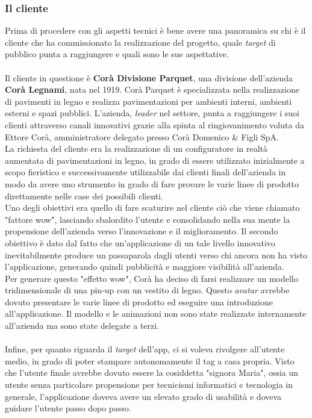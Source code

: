 \subsubsection{Il cliente}
Prima di procedere con gli aspetti tecnici \`e bene avere una panoramica su chi \`e il cliente che ha commissionato la realizzazione del progetto, quale \textit{target} di pubblico punta a raggiungere e quali sono le sue aspettative.
\\\\
Il cliente in questione \`e \textbf{Cor\`a Divisione Parquet}, una divisione dell'azienda \textbf{Cor\`a Legnami}, nata nel 1919. Cor\`a Parquet \`e specializzata nella realizzazione di pavimenti in legno e realizza pavimentazioni per ambienti interni, ambienti esterni e spazi pubblici. L'azienda, \textit{leader} nel settore, punta a raggiungere i suoi clienti attraverso canali innovativi grazie alla spinta al ringiovanimento voluta da Ettore Cor\`a, amministratore delegato presso Cor\`a Domenico \& Figli SpA.\\
La richiesta del cliente era la realizzazione di un configuratore in realt\`a aumentata di pavimentazioni in legno, in grado di essere utilizzato inizialmente a scopo fieristico e successivamente utilizzabile dai clienti finali dell'azienda in modo da avere uno strumento in grado di fare provare le varie linee di prodotto direttamente nelle case dei possibili clienti.\\
Uno degli obiettivi era quello di fare scaturire nel cliente ci\`o che viene chiamato "fattore wow", lasciando sbalordito l'utente e consolidando nella sua mente la propensione dell'azienda verso l'innovazione e il miglioramento.
Il secondo obiettivo \`e dato dal fatto che un'applicazione di un tale livello innovativo inevitabilmente produce un passaparola dagli utenti verso chi ancora non ha visto l'applicazione, generando quindi pubblicit\`a e maggiore visibilit\`a all'azienda.\\
Per generare questo "effetto wow", Cor\`a ha deciso di farsi realizzare un modello tridimensionale di una pin-up con un vestito di legno. Questo \textit{avatar\gloss} avrebbe dovuto presentare le varie linee di prodotto ed eseguire una introduzione all'applicazione. Il modello e le animazioni non sono state realizzate internamente all'azienda ma sono state delegate a terzi.\\\\
Infine, per quanto riguarda il \textit{target} dell'app, ci si voleva rivolgere all'utente medio, in grado di poter stampare autonomamente il tag a casa propria. Visto che l'utente finale avrebbe dovuto essere la cosiddetta "signora Maria", ossia un utente senza particolare propensione per tecnicismi informatici e tecnologia in generale, l'applicazione doveva avere un elevato grado di usabilit\`a e doveva guidare l'utente passo dopo passo.

